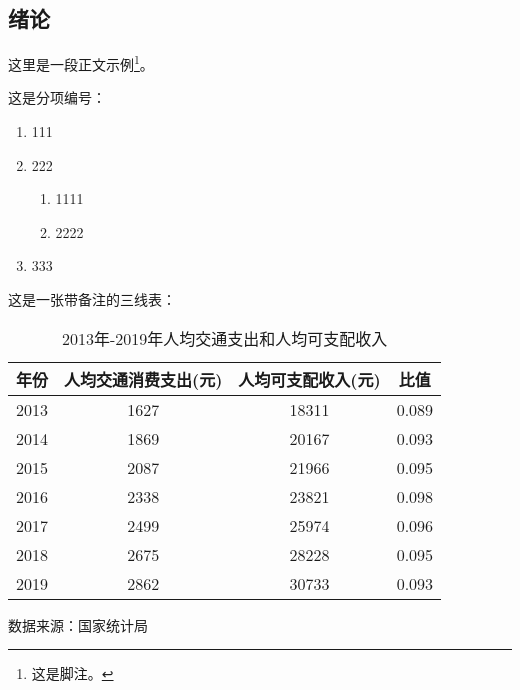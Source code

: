 \documentclass[12pt,UTF8]{ctexart}
\begin{document}
\begin{spacing}{1.25}
\section{绪论}
这里是一段正文示例\footnote{这是脚注。}。

这是分项编号：
\begin{enumerate}[label = (\arabic*)]
    \item 111
    \item 222
        \begin{enumerate}[label=\textcircled{\arabic*}]
            \item 1111
            \item 2222
        \end{enumerate}
    \item 333
\end{enumerate}

这是一张带备注的三线表：
\begin{table}[H]
\centering
\caption{2013年-2019年人均交通支出和人均可支配收入}
\label{tab:trans}
\begin{threeparttable}
\begin{tabular}{@{}cccc@{}}
\toprule
\textbf{年份} & \textbf{人均交通消费支出(元)} & \textbf{人均可支配收入(元)} & \textbf{比值} \\ \midrule
2013        & 1627                 & 18311               & 0.089       \\
2014        & 1869                 & 20167               & 0.093       \\
2015        & 2087                 & 21966               & 0.095       \\
2016        & 2338                 & 23821               & 0.098       \\
2017        & 2499                 & 25974               & 0.096       \\
2018        & 2675                 & 28228               & 0.095       \\
2019        & 2862                 & 30733               & 0.093       \\ \bottomrule
\end{tabular}
\begin{tablenotes}
    \item \footnotesize 数据来源：国家统计局
\end{tablenotes}
\end{threeparttable}
\end{table}


\end{spacing}
\end{document}
